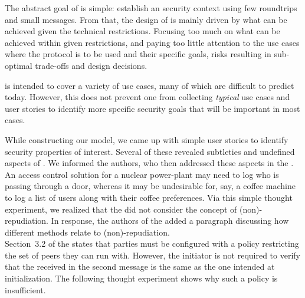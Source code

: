 \documentclass[runningheads, envcountsame, hidelinks, a4paper, draft, x11names]{llncs}
\begin{document}
The abstract goal of \mEdhoc{} is simple: establish an \mOscore{} security
context using few roundtrips and small messages.
%
From that, the design of \mEdhoc{} is mainly driven by what
can be achieved given the technical restrictions.
%
Focusing too much on what can be achieved within given restrictions, and paying
too little attention to the use cases where the
protocol is to be used and their specific goals, risks resulting in
sub-optimal trade-offs and design decisions.
%

\mEdhoc{} is intended to cover a variety of use cases, many of which are
difficult to predict today.
%
However, this does not
prevent one from collecting \emph{typical} use cases and user stories
to identify more specific security goals that will be important in most cases.
%

While constructing our model, we came up with simple user stories to identify
security properties of interest.
%
Several of these revealed subtleties and undefined aspects of \mEdhoc{}.
%
We informed the \mEdhoc{} authors, who then addressed these aspects in the
\mSpec{}.\\
%

An access control solution for a nuclear power-plant may need to log who is
passing through a door, whereas it may be undesirable for, say, a coffee
machine to log a list of users along with their coffee preferences.
%
Via this simple thought experiment, we realized that the \mSpec{} did not
consider the concept of (non)-repudiation.
%
In response, the authors of the \mSpec{} added a paragraph discussing how
different methods relate to (non)-repudiation.\\

Section~3.2 of the \mSpec{} states that parties must be configured
with a policy restricting the set of peers they can run \mEdhoc{} with.
%
However, the initiator is not required to verify that the \mIdcredr{} received
in the second message is the same as the one intended at initialization.
%
The following thought experiment shows why such a policy is insufficient.
%
\end{document}
